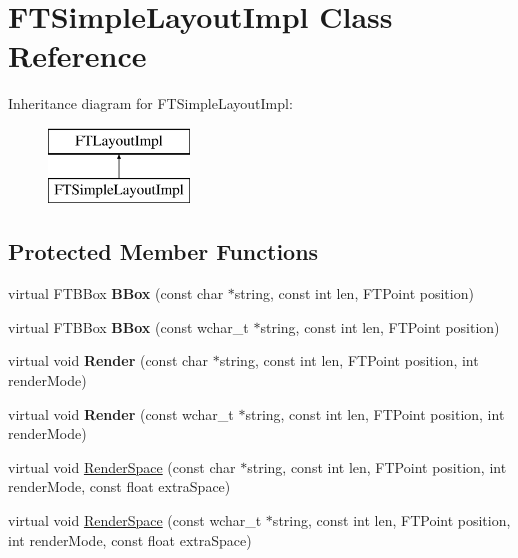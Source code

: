 \hypertarget{class_f_t_simple_layout_impl}{\section{F\-T\-Simple\-Layout\-Impl Class Reference}
\label{class_f_t_simple_layout_impl}
}
Inheritance diagram for F\-T\-Simple\-Layout\-Impl\-:\begin{figure}[H]
\begin{center}
\leavevmode
\includegraphics[height=2.000000cm]{class_f_t_simple_layout_impl}
\end{center}
\end{figure}
\subsection*{Protected Member Functions}
\begin{DoxyCompactItemize}
\item 
\hypertarget{class_f_t_simple_layout_impl_a6cdedbc1045881dcb3ddedea054a7987}{virtual F\-T\-B\-Box {\bfseries B\-Box} (const char $\ast$string, const int len, F\-T\-Point position)}\label{class_f_t_simple_layout_impl_a6cdedbc1045881dcb3ddedea054a7987}

\item 
\hypertarget{class_f_t_simple_layout_impl_a682650a15a67eb182b2de9e7001875cb}{virtual F\-T\-B\-Box {\bfseries B\-Box} (const wchar\-\_\-t $\ast$string, const int len, F\-T\-Point position)}\label{class_f_t_simple_layout_impl_a682650a15a67eb182b2de9e7001875cb}

\item 
\hypertarget{class_f_t_simple_layout_impl_abfe85f44b3d4a2f8691b5e11ab26828a}{virtual void {\bfseries Render} (const char $\ast$string, const int len, F\-T\-Point position, int render\-Mode)}\label{class_f_t_simple_layout_impl_abfe85f44b3d4a2f8691b5e11ab26828a}

\item 
\hypertarget{class_f_t_simple_layout_impl_ac69f1a3cdac5e6dd692b547df3f77825}{virtual void {\bfseries Render} (const wchar\-\_\-t $\ast$string, const int len, F\-T\-Point position, int render\-Mode)}\label{class_f_t_simple_layout_impl_ac69f1a3cdac5e6dd692b547df3f77825}

\item 
virtual void \hyperlink{class_f_t_simple_layout_impl_abdbd064c650f1e17d2bd3139536aff47}{Render\-Space} (const char $\ast$string, const int len, F\-T\-Point position, int render\-Mode, const float extra\-Space)
\item 
virtual void \hyperlink{class_f_t_simple_layout_impl_a6b5334d053e9c79dd459f8b88c0e60a4}{Render\-Space} (const wchar\-\_\-t $\ast$string, const int len, F\-T\-Point position, int render\-Mode, const float extra\-Space)
\end{DoxyCompactItemize}

